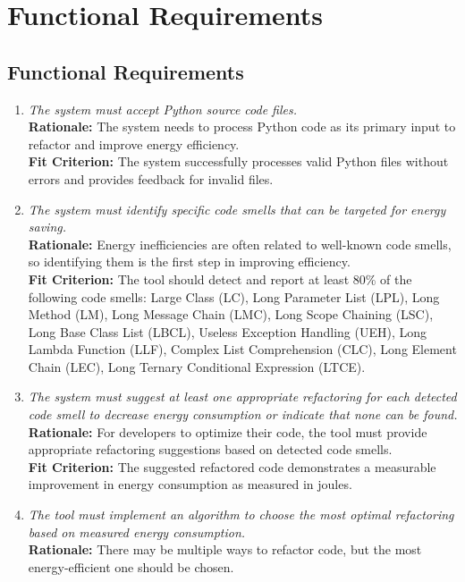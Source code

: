 \documentclass[12pt]{article}
\begin{document}
\section{Functional Requirements}
\subsection{Functional Requirements}
\begin{enumerate}[label=FR \arabic*., wide=0pt, leftmargin=*]
    \item \emph{The system must accept Python source code files.}\\
    {\bf Rationale:} The system needs to process Python code as its primary input to refactor and improve energy efficiency.\\
    {\bf Fit Criterion:} The system successfully processes valid Python files without errors and provides feedback for invalid files.
    \item \emph{The system must identify specific code smells that can be targeted for energy saving.}\\
    {\bf Rationale:} Energy inefficiencies are often related to well-known code smells, so identifying them is the first step in improving efficiency.\\
    {\bf Fit Criterion:} The tool should detect and report at least 80\% of the following code smells: Large Class (LC), Long Parameter List (LPL), Long Method (LM), Long Message Chain (LMC), Long Scope Chaining (LSC), Long Base Class List (LBCL), Useless Exception Handling (UEH), Long Lambda Function (LLF), Complex List Comprehension (CLC), Long Element Chain (LEC), Long Ternary Conditional Expression (LTCE).
    \item \emph{The system must suggest at least one appropriate refactoring for each detected code smell to decrease energy consumption or indicate that none can be found.}\\
    {\bf Rationale:} For developers to optimize their code, the tool must provide appropriate refactoring suggestions based on detected code smells.\\
    {\bf Fit Criterion:} The suggested refactored code demonstrates a measurable improvement in energy consumption as measured in joules.
    \item \emph{The tool must implement an algorithm to choose the most optimal refactoring based on measured energy consumption.}\\
    {\bf Rationale:} There may be multiple ways to refactor code, but the most energy-efficient one should be chosen.\\

\end{enumerate}
\end{document}
